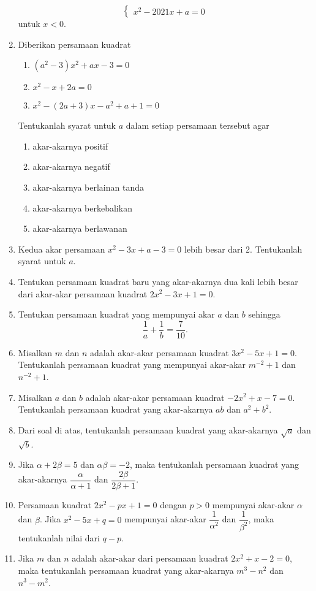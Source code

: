 \begin{enumerate}[topsep=0pt]
\[\begin{cases}
					x^{2} - 2021x + a = 0
				\end{cases}
			\]
			untuk $ x < 0 $.
			\item Diberikan persamaan kuadrat
			\begin{enumerate}[label=(\roman*)]
				\item $ \left(a^{2} - 3\right)x^{2} + ax - 3 = 0 $
				\item $ x^{2} - x + 2a = 0 $
				\item $ x^{2} - \left(2a + 3\right)x - a^{2} + a + 1 = 0 $
			\end{enumerate}
			Tentukanlah syarat untuk $ a $ dalam setiap persamaan tersebut agar
			\begin{multcols}
				\begin{enumerate}
					\item akar-akarnya positif
					\item akar-akarnya negatif
					\item akar-akarnya berlainan tanda
					\item akar-akarnya berkebalikan
					\item akar-akarnya berlawanan
				\end{enumerate}
			\end{multcols}
			\item Kedua akar persamaan $ x^{2} - 3x + a - 3 = 0 $ lebih besar dari 2. Tentukanlah syarat untuk $ a $.
			\item Tentukan persamaan kuadrat baru yang akar-akarnya dua kali lebih besar dari akar-akar persamaan kuadrat $ 2x^{2} - 3x + 1 = 0 $.
			\item Tentukan persamaan kuadrat yang mempunyai akar $ a $ dan $ b $ sehingga
			\[ \frac{1}{a} + \frac{1}{b} = \frac{7}{10}. \]
			\item Misalkan $ m $ dan $ n $ adalah akar-akar persamaan kuadrat $ 3x^{2} - 5x + 1 = 0 $. Tentukanlah persamaan kuadrat yang mempunyai akar-akar $ m^{-2} + 1 $ dan $ n^{-2} + 1 $.
			\item Misalkan $ a $ dan $ b $ adalah akar-akar persamaan kuadrat $ -2x^{2} + x - 7 = 0 $. Tentukanlah persamaan kuadrat yang akar-akarnya $ ab $ dan $ a^{2} + b^{2} $.
			\item Dari soal di atas, tentukanlah persamaan kuadrat yang akar-akarnya $ \sqrt{a} $ dan $ \sqrt{b} $.
			\item Jika $ \alpha  + 2\beta = 5 $ dan $ \alpha\beta = -2 $, maka tentukanlah persamaan kuadrat yang akar-akarnya $ \dfrac{\alpha}{\alpha + 1} $ dan $ \dfrac{2\beta}{2\beta + 1} $.
			\item Persamaan kuadrat $ 2x^{2} - px + 1 = 0 $ dengan $ p > 0 $ mempunyai akar-akar $ \alpha $ dan $ \beta $. Jika $ x^{2} - 5x + q = 0 $ mempunyai akar-akar $ \dfrac{1}{\alpha^{2}} $ dan $ \dfrac{1}{\beta^{2}} $, maka tentukanlah nilai dari $ q - p $.
			\item Jika $ m $ dan $ n $ adalah akar-akar dari persamaan kuadrat $ 2x^{2} + x - 2 = 0 $, maka tentukanlah persamaan kuadrat yang akar-akarnya $ m^{3} - n^{2} $ dan $ n^{3} - m^{2} $.
		\end{enumerate}
	
